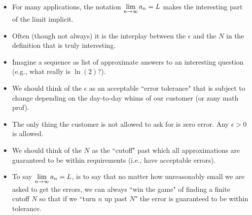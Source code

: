 \begin{remark}\,
\begin{itemize}
\item For many applications, the notation $\displaystyle\lim_{n\to\infty} a_n= L$ makes the interesting part of the limit implicit.
\item Often (though not always) it is the interplay between the $\epsilon$ and the $N$ in the definition that is truly interesting.
\item Imagine a sequence as list of approximate answers to an interesting question (e.g., what really is $\ln(2)$?).
\item We should think of the $\epsilon$ as an acceptable ``error tolerance" that is subject to change depending on the day-to-day whims of our customer (or zany math prof).
\item The only thing the customer is not allowed to ask for is zero error.  Any $\epsilon>0$ is allowed.
\item We should think of the $N$ as the ``cutoff" past which all approximations are guaranteed to be within requirements (i.e., have acceptable errors).
\item To say $\displaystyle\lim_{n\to\infty} a_n= L$, is to say that no matter how unreasonably small we are asked to get the errors, we can always ``win the game" of finding a finite cutoff $N$ so that if we ``turn $n$ up past $N$" the error is guaranteed to be within tolerance.
\end{itemize}
\end{remark}

\newpage

